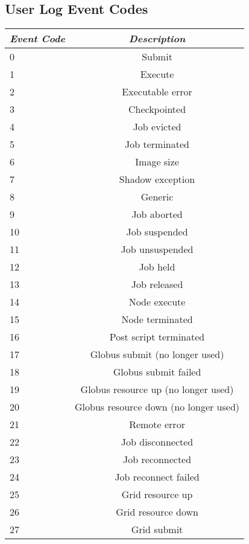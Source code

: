 \subsection*{User Log Event Codes}

\begin{center}
\begin{table}[hbt]
\begin{tabular}{|l|c|} \hline
\emph{Event Code} & \emph{Description}   \\ \hline \hline
0   &   Submit  \\ \hline
1   &   Execute  \\ \hline
2   &   Executable error  \\ \hline
3   &   Checkpointed  \\ \hline
4   &   Job evicted  \\ \hline
5   &   Job terminated  \\ \hline
6   &   Image size  \\ \hline
7   &   Shadow exception  \\ \hline
8   &   Generic  \\ \hline
9   &   Job aborted  \\ \hline
10  &   Job suspended  \\ \hline
11  &   Job unsuspended  \\ \hline
12  &   Job held  \\ \hline
13  &   Job released  \\ \hline
14  &   Node execute  \\ \hline
15  &   Node terminated  \\ \hline
16  &   Post script terminated  \\ \hline
17  &   Globus submit (no longer used)  \\ \hline
18  &   Globus submit failed  \\ \hline
19  &   Globus resource up (no longer used)  \\ \hline
20  &   Globus resource down (no longer used)  \\ \hline
21  &   Remote error  \\ \hline
22  &   Job disconnected  \\ \hline
23  &   Job reconnected  \\ \hline
24  &   Job reconnect failed  \\ \hline
25  &   Grid resource up \\ \hline
26  &   Grid resource down \\ \hline
27  &   Grid submit \\ \hline
\end{tabular}
\label{user-log-event-codes}
\end{table}
\end{center}

